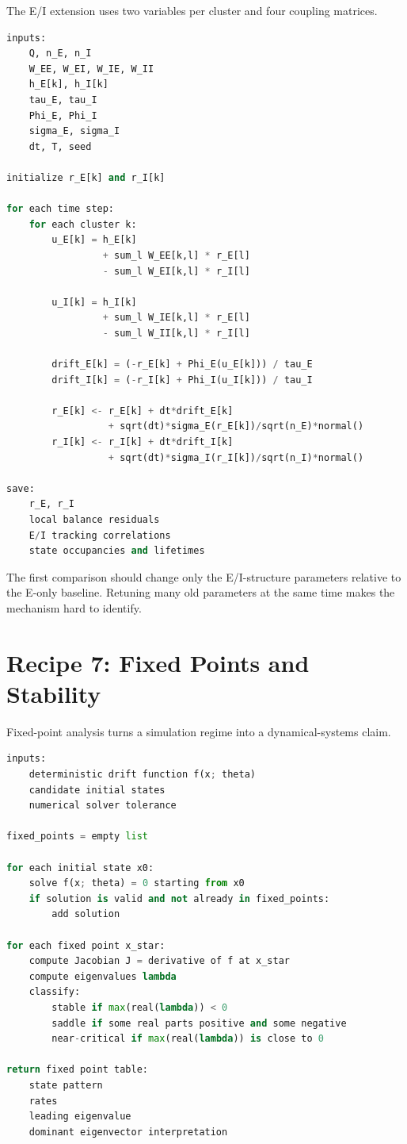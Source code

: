 The E/I extension uses two variables per cluster and four coupling matrices.

\begin{lstlisting}[language=Python,caption={Pseudocode for E/I mesoscopic integration.}]
inputs:
    Q, n_E, n_I
    W_EE, W_EI, W_IE, W_II
    h_E[k], h_I[k]
    tau_E, tau_I
    Phi_E, Phi_I
    sigma_E, sigma_I
    dt, T, seed

initialize r_E[k] and r_I[k]

for each time step:
    for each cluster k:
        u_E[k] = h_E[k]
                 + sum_l W_EE[k,l] * r_E[l]
                 - sum_l W_EI[k,l] * r_I[l]

        u_I[k] = h_I[k]
                 + sum_l W_IE[k,l] * r_E[l]
                 - sum_l W_II[k,l] * r_I[l]

        drift_E[k] = (-r_E[k] + Phi_E(u_E[k])) / tau_E
        drift_I[k] = (-r_I[k] + Phi_I(u_I[k])) / tau_I

        r_E[k] <- r_E[k] + dt*drift_E[k]
                  + sqrt(dt)*sigma_E(r_E[k])/sqrt(n_E)*normal()
        r_I[k] <- r_I[k] + dt*drift_I[k]
                  + sqrt(dt)*sigma_I(r_I[k])/sqrt(n_I)*normal()

save:
    r_E, r_I
    local balance residuals
    E/I tracking correlations
    state occupancies and lifetimes
\end{lstlisting}

The first comparison should change only the E/I-structure parameters relative to the E-only baseline. Retuning many old parameters at the same time makes the mechanism hard to identify.

\section{Recipe 7: Fixed Points and Stability}
\label{app:recipe-fixed-points-stability}

Fixed-point analysis turns a simulation regime into a dynamical-systems claim.

\begin{lstlisting}[language=Python,caption={Pseudocode for fixed-point and stability analysis.}]
inputs:
    deterministic drift function f(x; theta)
    candidate initial states
    numerical solver tolerance

fixed_points = empty list

for each initial state x0:
    solve f(x; theta) = 0 starting from x0
    if solution is valid and not already in fixed_points:
        add solution

for each fixed point x_star:
    compute Jacobian J = derivative of f at x_star
    compute eigenvalues lambda
    classify:
        stable if max(real(lambda)) < 0
        saddle if some real parts positive and some negative
        near-critical if max(real(lambda)) is close to 0

return fixed point table:
    state pattern
    rates
    leading eigenvalue
    dominant eigenvector interpretation
\end{lstlisting}

